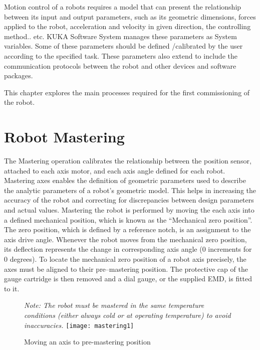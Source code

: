 	
	Motion control of a robots requires a model that can present the relationship between its input and output parameters, such as its geometric dimensions, forces applied to the robot, acceleration and velocity in given direction, the controlling method.. etc. KUKA Software System manages these parameters as System variables. Some of these parameters should be defined /calibrated by the user according to the specified task. These parameters also extend to include the communication protocols between the robot and other devices and software packages.
	
	This chapter explores the main processes required for the first commissioning of the robot.
	 
	\section{Robot Mastering}
	
	The Mastering operation calibrates the relationship between the position sensor, attached to each axis motor, and each axis angle defined for each robot. Mastering axes enables the definition of geometric parameters used to describe the analytic parameters of a robot’s geometric model. This helps in increasing the accuracy of the robot and correcting for discrepancies between design parameters and actual values.
	\newline
	Mastering the robot is performed by moving the each axis into a defined mechanical position, which is known as the “Mechanical zero position”. The zero position, which is defined by a reference notch, is an assignment to the axis drive angle. Whenever the robot moves from the mechanical zero position, its deflection represents the change in corresponding axis angle (0 increments for 0 degrees).
	\newline
	To locate the mechanical zero position of a robot axis precisely, the axes must be aligned to their pre–mastering position. The protective cap of the gauge cartridge is then removed and a dial gauge, or the supplied EMD, is fitted to it. 
	\begin{figure}[H]
        \centering
                    \textit{Note: The robot must be mastered in the same temperature conditions (either always cold or at operating temperature) to avoid inaccuracies.}
		\texttt{[image: mastering1]}
        		\caption{Moving an axis to pre-mastering position}
    \end{figure}
    
